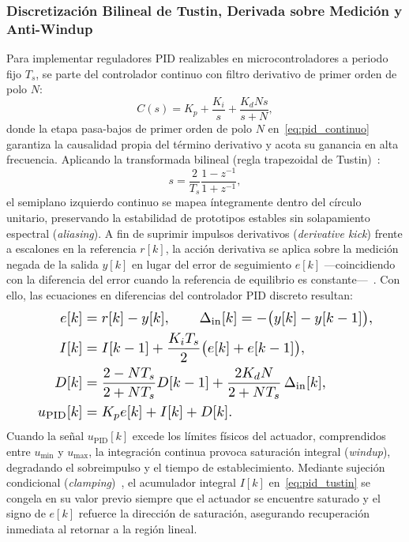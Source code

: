\subsubsection{Discretización Bilineal de Tustin, Derivada sobre Medición y Anti-Windup}
Para implementar reguladores PID realizables en microcontroladores a periodo fijo $T_s$, se parte del controlador continuo con filtro derivativo de primer orden de polo $N$:
\begin{equation}
    C(s) = K_p + \frac{K_i}{s} + \frac{K_d N s}{s + N},
    \label{eq:pid_continuo}
\end{equation}
donde la etapa pasa-bajos de primer orden de polo $N$ en~\eqref{eq:pid_continuo} garantiza la causalidad propia del término derivativo y acota su ganancia en alta frecuencia. Aplicando la transformada bilineal (regla trapezoidal de Tustin)~\cite{OgataDiscrete1995,Kuo1992,Astrom1997}:
\begin{equation}
    s = \frac{2}{T_s}\frac{1 - z^{-1}}{1 + z^{-1}},
    \label{eq:tustin_transform}
\end{equation}
el semiplano izquierdo continuo se mapea íntegramente dentro del círculo unitario, preservando la estabilidad de prototipos estables sin solapamiento espectral (\textit{aliasing}). A fin de suprimir impulsos derivativos (\textit{derivative kick}) frente a escalones en la referencia $r[k]$, la acción derivativa se aplica sobre la medición negada de la salida $y[k]$ en lugar del error de seguimiento $e[k]$ ---coincidiendo con la diferencia del error cuando la referencia de equilibrio es constante---~\cite{Astrom1997}. Con ello, las ecuaciones en diferencias del controlador PID discreto resultan:
\begin{equation}
\resizebox{0.88\columnwidth}{!}{$\displaystyle
    \begin{aligned}
        e[k] &= r[k] - y[k], \qquad \Delta_{\text{in}}[k] = -\bigl(y[k] - y[k-1]\bigr), \\
        I[k] &= I[k-1] + \frac{K_i T_s}{2}\bigl(e[k] + e[k-1]\bigr), \\
        D[k] &= \frac{2 - N T_s}{2 + N T_s}D[k-1] + \frac{2 K_d N}{2 + N T_s}\,\Delta_{\text{in}}[k], \\
        u_{\text{PID}}[k] &= K_p e[k] + I[k] + D[k].
    \end{aligned}
$}
    \label{eq:pid_tustin}
\end{equation}
Cuando la señal $u_{\text{PID}}[k]$ excede los límites físicos del actuador, comprendidos entre $u_{\min}$ y $u_{\max}$, la integración continua provoca saturación integral (\textit{windup}), degradando el sobreimpulso y el tiempo de establecimiento. Mediante sujeción condicional (\textit{clamping})~\cite{AstromAntiwindup1989,Peng1996}, el acumulador integral $I[k]$ en~\eqref{eq:pid_tustin} se congela en su valor previo siempre que el actuador se encuentre saturado y el signo de $e[k]$ refuerce la dirección de saturación, asegurando recuperación inmediata al retornar a la región lineal.

